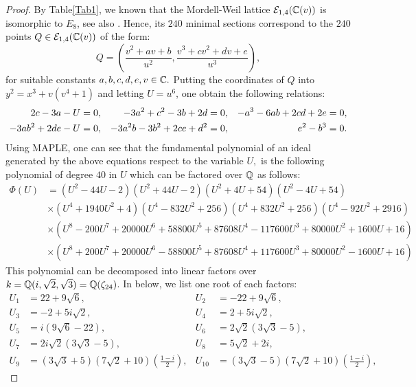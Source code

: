 \documentclass[11pt]{amsart}
\begin{document}
\begin{proof}
	By Table\ref{Tab1}, we   known that the Mordell-Weil lattice   ${\mathcal E}_{1, 4}({\mathbb C}(v))$ is isomorphic to $E_8$,  see also \cite{Shioda1991d}. Hence, its   $240$ minimal sections
	correspond to the  $240$ points  $Q\in {\mathcal E}_{1, 4}({\mathbb C}(v))$ of the form:
	\begin{equation}
		\label{eq1-4}
		Q=\left(\frac{v^2 +a v +b}{u^2}, \frac{v^3 + c v^2 + d v + e}{u^3} \right),
	\end{equation}
	for suitable constants $a, b, c, d, e, v \in {\mathbb C}.$ 
	Putting the coordinates of $Q$ into   $ y^2=x^3 + v ( v^4+1)$  and letting $U=u^6$, one  obtain  the following relations:
	\begin{align}
		2c -3a -U & =0, & 
		-3a^2+c^2-3 b+2 d & =0, &
		-a^3-6 a b+2cd+2e & =0, \notag \\ \label{rel3b}
		-3 a b^2+2 d e-U & =0, &
		-3 a^2 b-3 b^2+2 c e+d^2 & =0,& 
		e^2 - b^3 & = 0.
	\end{align}
Using MAPLE, one can see that 	the fundamental polynomial of an ideal generated by the above equations  respect to the variable $U,$   is the following  polynomial of degree $40$ in $U$ which can be factored over ${\mathbb Q}$ as follows:
	\begin{align*}
		\Phi(U)& =(U^2-44 U-2)(U^2+44 U-2) (U^2+4 U+54) (U^2-4 U+54)  \\
		& \times (U^4+1940 U^2+4) (U^4-832 U^2+256) (U^4+832 U^2+256) (U^4-92 U^2+2916) \\
		& \times(U^8-200 U^7+20000 U^6+58800 U^5+87608 U^4-117600 U^3+80000 U^2+1600 U+16)\\
		& \times (U^8+200 U^7+20000 U^6-58800 U^5+87608 U^4+117600 U^3+80000 U^2-1600 U+16)
	\end{align*}	
	This polynomial can be decomposed into linear factors over 
	$k={\mathbb Q} (i, \sqrt{2}, \sqrt{3})={\mathbb Q}(\zeta_{24})$. In below, we list one root of each factors:
	\begin{align*}
		U_1 & =22 + 9 \sqrt{6}, & U_2& = -22 + 9 \sqrt{6}, \\ U_3& =-2 +5 i \sqrt{2}, &	U_4 & =2+ 5 i \sqrt{2},  \\ U_5 &= i (9 \sqrt{6}-22), &	U_6 &= 2 \sqrt{2} (3 \sqrt{3}-5), \\ 
		 U_7 &= 2 i \sqrt{2} (3 \sqrt{3}-5), &
		U_8&=	  5 \sqrt{2} +2 i,\\
		U_9 & = (3 \sqrt{3}+5) (7 \sqrt{2}+10) \left(\frac{1-i}{2} \right), &
		U_{10} &=  (3 \sqrt{3}-5) (7 \sqrt{2}+10) \left(\frac{1-i}{2} \right),
	\end{align*}  

\end{proof}
\end{document}
